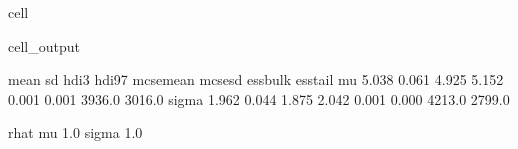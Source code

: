 \documentclass[letterpaper,10pt,english]{jupyterBook}
\begin{document}
\begin{sphinxuseclass}{cell}
\begin{sphinxVerbatimOutput}
\begin{sphinxuseclass}{cell_output}
\begin{sphinxVerbatim}[commandchars=\\\{\}]
        mean     sd  hdi\PYGZus{}3\PYGZpc{}  hdi\PYGZus{}97\PYGZpc{}  mcse\PYGZus{}mean  mcse\PYGZus{}sd  ess\PYGZus{}bulk  ess\PYGZus{}tail  \PYGZbs{}
mu     5.038  0.061   4.925    5.152      0.001    0.001    3936.0    3016.0   
sigma  1.962  0.044   1.875    2.042      0.001    0.000    4213.0    2799.0   

       r\PYGZus{}hat  
mu       1.0  
sigma    1.0  
\end{sphinxVerbatim}

\end{sphinxuseclass}\end{sphinxVerbatimOutput}

\end{sphinxuseclass}
\sphinxAtStartPar
{}
\end{document}
